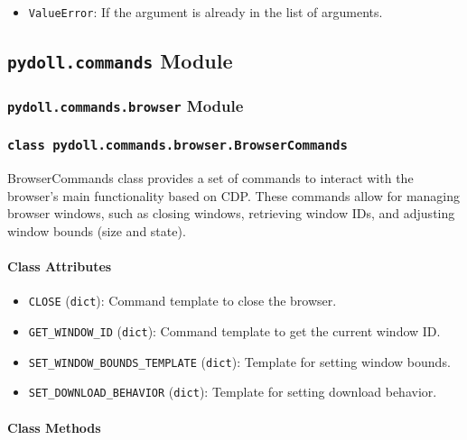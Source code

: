 \documentclass{article}
\begin{document}
\begin{itemize}
    \item \lstinline[style=pythonstyle]|ValueError|: If the argument is already in the list of arguments.
\end{itemize}

\hrulefill

\subsection*{\texttt{pydoll.commands} Module}

\subsubsection*{\texttt{pydoll.commands.browser} Module}

\subsubsection*{\texttt{class pydoll.commands.browser.BrowserCommands}}
\noindent BrowserCommands class provides a set of commands to interact with the browser's main functionality based on CDP\@. These commands allow for managing browser windows, such as closing windows, retrieving window IDs, and adjusting window bounds (size and state).

\paragraph{Class Attributes}

\begin{itemize}
    \item \lstinline[style=pythonstyle]|CLOSE| (\lstinline[style=pythonstyle]|dict|): Command template to close the browser.
    \item \lstinline[style=pythonstyle]|GET_WINDOW_ID| (\lstinline[style=pythonstyle]|dict|): Command template to get the current window ID.
    \item \lstinline[style=pythonstyle]|SET_WINDOW_BOUNDS_TEMPLATE| (\lstinline[style=pythonstyle]|dict|): Template for setting window bounds.
    \item \lstinline[style=pythonstyle]|SET_DOWNLOAD_BEHAVIOR| (\lstinline[style=pythonstyle]|dict|): Template for setting download behavior.
\end{itemize}

\paragraph{Class Methods}
\end{document}
